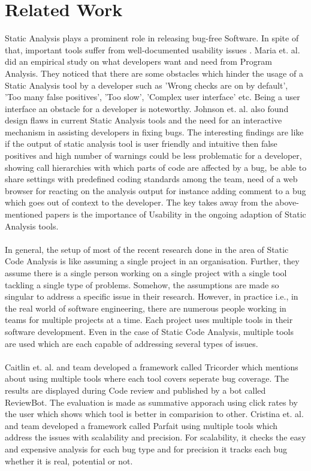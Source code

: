 \chapter{Related Work}
\label{ch:relatedwork}

Static Analysis plays a prominent role in releasing bug-free Software. In spite of that, important tools suffer from well-documented usability issues \cite{CB16,JSMB13}.  Maria et. al. \cite{CB16} did an empirical study on what developers want and need from Program Analysis. They noticed that there are some obstacles which hinder the usage of a Static Analysis tool by a developer such as 'Wrong checks are on by default', 'Too many false positives', 'Too slow',  'Complex user interface' etc. Being a user interface an obstacle for a developer is noteworthy. Johnson et. al. \cite{JSMB13} also found design flaws in current Static Analysis tools and the need for an interactive mechanism in assisting developers in fixing bugs. The interesting findings are like if the output of static analysis tool is user friendly and intuitive then false positives and high number of warnings could be less problematic for a developer, showing call hierarchies with which parts of code are affected by a bug, be able to share settings with predefined coding standards among the team, need of a web browser for reacting on the analysis output for instance adding comment to a bug which goes out of context to the developer. The key takes away from the above-mentioned papers is the importance of Usability in the ongoing adaption of Static Analysis tools. \\ \\ 

In general, the setup of most of the recent research \cite{CB16} \cite{JSMB13} done in the area of Static Code Analysis is like assuming a single project in an organisation. Further, they assume there is a single person working on a single project with a single tool tackling a single type of problems.  Somehow, the assumptions are made so singular to address a specific issue in their research. However, in practice i.e., in the real world of software engineering, there are numerous people working in teams for multiple projects at a time. Each project uses multiple tools in their software development. Even in the case of Static Code Analysis, multiple tools are used which are each capable of addressing several types of issues. \\ \\

Caitlin et. al. and team developed a framework called Tricorder \cite{tricorder} which mentions about using multiple tools where each tool covers seperate bug coverage. The results are displayed during Code review and published by a bot called ReviewBot. The evaluation is made as summative apporach using click rates by the user which shows which tool is better in comparision to other. Cristina et. al. and team developed a framework called Parfait \cite{parfait} using multiple tools which address the issues with scalability and precision. For scalability, it checks the easy and expensive analysis for each bug type and for precision it tracks each bug whether it is real, potential or not.
